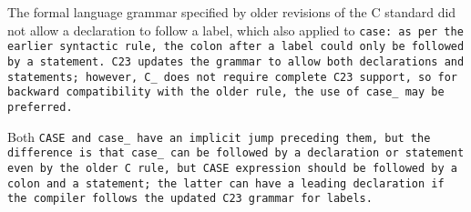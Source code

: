 The formal language grammar specified by older revisions of the C standard
did not allow a declaration to follow a label, which also applied to \tt{case}:
as per the earlier syntactic rule,
the colon after a label could only be followed by a statement.
C23 updates the grammar to allow both declarations and statements;
however, C\_ does not require complete C23 support, so for backward
compatibility with the older rule, the use of \tt{case_} may be preferred.

Both \tt{CASE} and \tt{case_} have an implicit jump preceding them,
but the difference is that \tt{case_} can be followed by a declaration or
statement even by the older C rule, but \tt{CASE} expression should be
followed by a colon and a statement; the latter can have a leading
declaration if the compiler follows the updated C23 grammar for labels.

